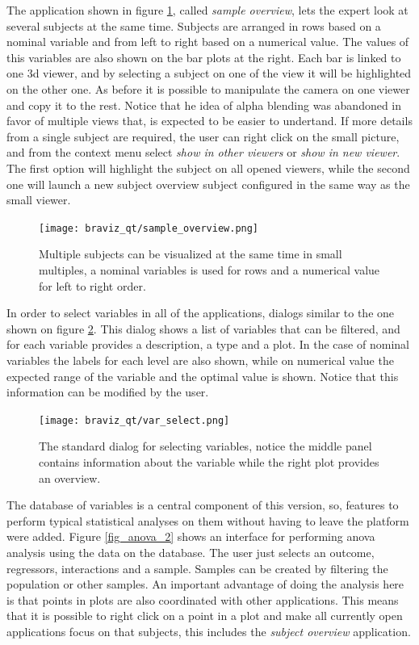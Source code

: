 The application shown in figure \ref{fig_sample_overview_2}, called \emph{sample overview}, lets the expert look at several subjects at the same time. Subjects are arranged in rows based on a nominal variable and from left to right based on a numerical value. The values of this variables are also shown on the bar plots at the right. Each bar is linked to one 3d viewer, and by selecting a subject on one of the view it will be highlighted on the other one. As before it is possible to manipulate the camera on one viewer and copy it to the rest. Notice that he idea of alpha blending was abandoned in favor of multiple views that, is expected to be easier to undertand. If more details from a single subject are required, the user can right click on the small picture, and from the context menu select \emph{show in other viewers} or \emph{show in new viewer}. The first option will highlight the subject on all opened viewers, while the second one will launch a new subject overview subject configured in the same way as the small viewer.

\begin{figure}
\centering
\texttt{[image: braviz\_qt/sample\_overview.png]}
\caption{\label{fig_sample_overview_2}Multiple subjects can be visualized at the same time in small multiples, a nominal variables is used for rows and a numerical value for left to right order.}
\end{figure}

In order to select variables in all of the applications, dialogs similar to the one shown on figure \ref{fig_var_select}. This dialog shows a list of variables that can be filtered, and for each variable provides a description, a type and a plot. In the case of nominal variables the labels for each level are also shown, while on numerical value the expected range of the variable and the optimal value is shown. Notice that this information can be modified by the user.

\begin{figure}
\centering
\texttt{[image: braviz\_qt/var\_select.png]}
\caption{\label{fig_var_select}The standard dialog for selecting variables, notice the middle panel contains information about the variable while the right plot provides an overview.}
\end{figure}

The database of variables is a central component of this version, so, features to perform typical statistical analyses on them without having to leave the platform were added. Figure \ref{fig_anova_2} shows an interface for performing anova  analysis using the data on the database. The user just selects an outcome, regressors, interactions and a sample. Samples can be created by filtering the population or other samples. An important advantage of doing the analysis here is that points in plots are also coordinated with other applications. This means that it is possible to right click on a point in a plot and make all currently open applications focus on that subjects, this includes the \emph{subject overview} application.

